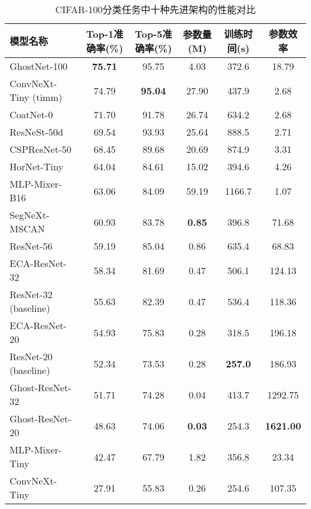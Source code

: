 \begin{table}[ht]
\centering
\caption{CIFAR-100分类任务中十种先进架构的性能对比}
\label{tab:performance_comparison}
\begin{tabular}{lccccc}
\toprule
\textbf{模型名称} & \textbf{Top-1准确率(\%)} & \textbf{Top-5准确率(\%)} & \textbf{参数量(M)} & \textbf{训练时间(s)} & \textbf{参数效率} \\
\midrule
GhostNet-100 & \textbf{75.71} & 95.75 & 4.03 & 372.6 & 18.79 \\
ConvNeXt-Tiny (timm) & 74.79 & \textbf{95.04} & 27.90 & 437.9 & 2.68 \\
CoatNet-0 & 71.70 & 91.78 & 26.74 & 634.2 & 2.68 \\
ResNeSt-50d & 69.54 & 93.93 & 25.64 & 888.5 & 2.71 \\
CSPResNet-50 & 68.45 & 89.68 & 20.69 & 874.9 & 3.31 \\
HorNet-Tiny & 64.04 & 84.61 & 15.02 & 394.6 & 4.26 \\
MLP-Mixer-B16 & 63.06 & 84.09 & 59.19 & 1166.7 & 1.07 \\
SegNeXt-MSCAN & 60.93 & 83.78 & \textbf{0.85} & 396.8 & 71.68 \\
ResNet-56 & 59.19 & 85.04 & 0.86 & 635.4 & 68.83 \\
ECA-ResNet-32 & 58.34 & 81.69 & 0.47 & 506.1 & 124.13 \\
\midrule
ResNet-32 (baseline) & 55.63 & 82.39 & 0.47 & 536.4 & 118.36 \\
ECA-ResNet-20 & 54.93 & 75.83 & 0.28 & 318.5 & 196.18 \\
ResNet-20 (baseline) & 52.34 & 73.53 & 0.28 & \textbf{257.0} & 186.93 \\
Ghost-ResNet-32 & 51.71 & 74.28 & 0.04 & 413.7 & 1292.75 \\
Ghost-ResNet-20 & 48.63 & 74.06 & \textbf{0.03} & 254.3 & \textbf{1621.00} \\
MLP-Mixer-Tiny & 42.47 & 67.79 & 1.82 & 356.8 & 23.34 \\
ConvNeXt-Tiny & 27.91 & 55.83 & 0.26 & 254.6 & 107.35 \\
\bottomrule
\end{tabular}
\end{table}

